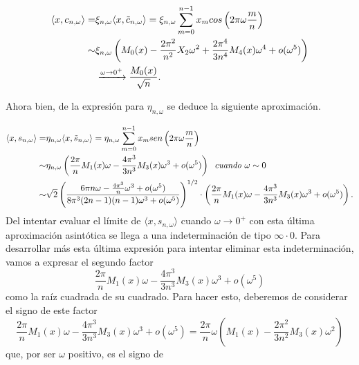\noindent
\begin{align*}
\langle x,
c_{n, \omega}
\rangle = & 
\xi_{n, \omega} \langle x,
\tilde{c}_{n, \omega}
\rangle =  
\xi_{n, \omega} \sum\limits_{m=0}^{n-1}x_{m} cos \left(
2 \pi \omega \frac{m}{n}
\right)
\\
\sim &
\xi_{n, \omega} 
\left(
M_{0}(x) - \frac{2 \pi^{2}}{n^{2}}X_{2} \omega^{2} 
+ \frac{2 \pi^{4}}{3n^{4}} M_{4}(x) \omega^{4} + o(\omega^{5})
\right) \\ &
\xrightarrow{\omega \rightarrow 0^{+}} \frac{M_{0}(x)}{\sqrt{n}}
. \\
\end{align*}

\noindent
Ahora bien, de la expresión para
$\eta_{n, \omega}$ se deduce la siguiente aproximación.

\begin{align*}
\langle x,
s_{n, \omega}
\rangle =
& 
\eta_{n, \omega} \langle x,
\tilde{s}_{n, \omega}
\rangle =  
\eta_{n, \omega} \sum\limits_{m=0}^{n-1}x_{m} sen \left(
2 \pi \omega \frac{m}{n}
\right) \\
\sim &
\eta_{n, \omega}
\left(
\frac{2 \pi}{n} M_{1}(x) \omega - \frac{4 \pi^{3}}{3n^{3}}M_{3}(x) \omega^{3} 
 + o(\omega^{5})
\right)
\hspace{0.2cm}
\textit{cuando } \omega \sim 0
\\
\sim & 
\sqrt{2} 
\left(
\frac{
6 \pi n \omega -
\frac{4 \pi^{3}}{n} \omega^{3} + o(\omega^{5})
}{8 \pi^{3} (2n-1)(n-1)\omega^{3} + o(\omega^{5})
}
\right)^{1/2}
\cdot 
\left(
\frac{2 \pi}{n} M_{1}(x) \omega - \frac{4 \pi^{3}}{3n^{3}}M_{3}(x) \omega^{3} 
 + o(\omega^{5})
\right).
\end{align*}
Del intentar evaluar el límite de
$\langle x,
s_{n, \omega}
\rangle $ cuando $\omega \rightarrow 0^{+}$
con esta última aproximación asintótica se llega a una
indeterminación de tipo $\infty \cdot 0$.
Para desarrollar más esta última expresión para intentar
eliminar esta indeterminación, vamos a expresar 
el segundo factor 
\begin{equation}
\label{ec: seg factor}
\frac{2 \pi}{n} M_{1}(x) \omega - \frac{4 \pi^{3}}{3n^{3}}M_{3}(x) \omega^{3} 
 + o(\omega^{5})
\end{equation}
como la raíz cuadrada de su cuadrado.
Para hacer esto, deberemos de considerar el signo de este factor
\[
\frac{2 \pi}{n} M_{1}(x) \omega - \frac{4 \pi^{3}}{3n^{3}}M_{3}(x) \omega^{3} 
 + o(\omega^{5}) = 
 \frac{2\pi}{n} \omega \left(
 M_{1}(x) - \frac{2\pi^{2}}{3n^{2}}M_{3}(x)\omega^{2}
\right)
\]
que, por ser $\omega$ positivo, es el signo de 
